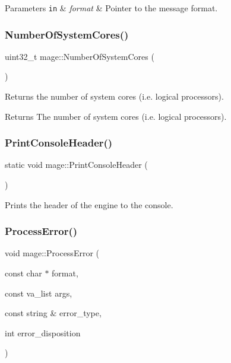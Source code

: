 \begin{DoxyParams}[1]{Parameters}
\mbox{\tt in}  & {\em format} & Pointer to the message format. \\
\hline
\end{DoxyParams}
\hypertarget{namespacemage_abc47a1cf24b1224ad55d8022a1f3b2dc}{}\label{namespacemage_abc47a1cf24b1224ad55d8022a1f3b2dc} 
\subsubsection{\texorpdfstring{Number\+Of\+System\+Cores()}{NumberOfSystemCores()}}
{\footnotesize\ttfamily uint32\+\_\+t mage\+::\+Number\+Of\+System\+Cores (\begin{DoxyParamCaption}{ }\end{DoxyParamCaption})}

Returns the number of system cores (i.\+e. logical processors).

\begin{DoxyReturn}{Returns}
The number of system cores (i.\+e. logical processors). 
\end{DoxyReturn}
\hypertarget{namespacemage_afb64e5bf4755b0a56a7b0d086bc5f4be}{}\label{namespacemage_afb64e5bf4755b0a56a7b0d086bc5f4be} 
\subsubsection{\texorpdfstring{Print\+Console\+Header()}{PrintConsoleHeader()}}
{\footnotesize\ttfamily static void mage\+::\+Print\+Console\+Header (\begin{DoxyParamCaption}{ }\end{DoxyParamCaption})\hspace{0.3cm}{\ttfamily [static]}}

Prints the header of the engine to the console. \hypertarget{namespacemage_a958c4a88b6cd58f950e1c9b9e46f6906}{}\label{namespacemage_a958c4a88b6cd58f950e1c9b9e46f6906} 
\subsubsection{\texorpdfstring{Process\+Error()}{ProcessError()}}
{\footnotesize\ttfamily void mage\+::\+Process\+Error (\begin{DoxyParamCaption}\item[{const char $\ast$}]{format,  }\item[{const va\+\_\+list}]{args,  }\item[{const string \&}]{error\+\_\+type,  }\item[{int}]{error\+\_\+disposition }\end{DoxyParamCaption})}

